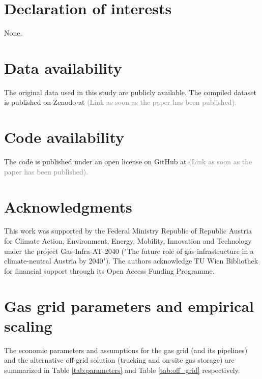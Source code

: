 \documentclass[review]{elsarticle}
\begin{document}
\section*{Declaration of interests}
None.
\section*{Data availability}
The original data used in this study are publicly available. The compiled dataset is published on Zenodo at \textcolor{gray}{(Link as soon as the paper has been published).} 
\section*{Code availability}
The code is published under an open license on GitHub at \textcolor{gray}{(Link as soon as the paper has been published).}

\section*{Acknowledgments}
This work was supported by the Federal Ministry Republic of Republic Austria
for Climate Action, Environment, Energy, Mobility, Innovation and Technology under the project Gas-Infra-AT-2040 ("The future role of gas infrastructure in a climate-neutral Austria by 2040"). The authors acknowledge TU Wien Bibliothek for financial support through its Open Access Funding Programme.



\appendix
\setcounter{table}{0}
\setcounter{figure}{0}
\newpage
\section{Gas grid parameters and empirical scaling}\label{paramter}
The economic parameters and assumptions for the gas grid (and its pipelines) and the alternative off-grid solution (trucking and on-site gas storage) are summarized in Table \ref{tab:parameters} and Table \ref{tab:off_grid} respectively. 
\end{document}
